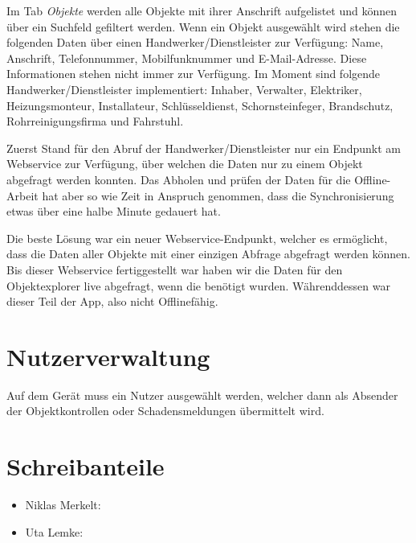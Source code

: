 \documentclass[12pt]{article}
\begin{document}
Im Tab \textit{Objekte} werden alle Objekte mit ihrer Anschrift aufgelistet und können über ein Suchfeld gefiltert werden. Wenn ein Objekt ausgewählt wird stehen die folgenden Daten über einen Handwerker/Dienstleister zur Verfügung: Name, Anschrift, Telefonnummer, Mobilfunknummer und E-Mail-Adresse. Diese Informationen stehen nicht immer zur Verfügung. Im Moment sind folgende Handwerker/Dienstleister implementiert: Inhaber, Verwalter, Elektriker, Heizungsmonteur, Installateur, Schlüsseldienst, Schornsteinfeger, Brandschutz, Rohrreinigungsfirma und Fahrstuhl.

Zuerst Stand für den Abruf der Handwerker/Dienstleister nur ein Endpunkt am Webservice zur Verfügung, über welchen die Daten nur zu einem Objekt abgefragt werden konnten. Das Abholen und prüfen der Daten für die Offline-Arbeit hat aber so wie Zeit in Anspruch genommen, dass die Synchronisierung etwas über eine halbe Minute gedauert hat.

Die beste Lösung war ein neuer Webservice-Endpunkt, welcher es ermöglicht, dass die Daten aller Objekte mit einer einzigen Abfrage abgefragt werden können. Bis dieser Webservice fertiggestellt war haben wir die Daten für den Objektexplorer live abgefragt, wenn die benötigt wurden. Währenddessen war dieser Teil der App, also nicht Offlinefähig.

\section{Nutzerverwaltung}
Auf dem Gerät muss ein Nutzer ausgewählt werden, welcher dann als Absender der Objektkontrollen oder Schadensmeldungen übermittelt wird.

\section{Schreibanteile}
\begin{itemize}
	\item Niklas Merkelt:
	\item Uta Lemke:
\end{itemize}
\end{document}
